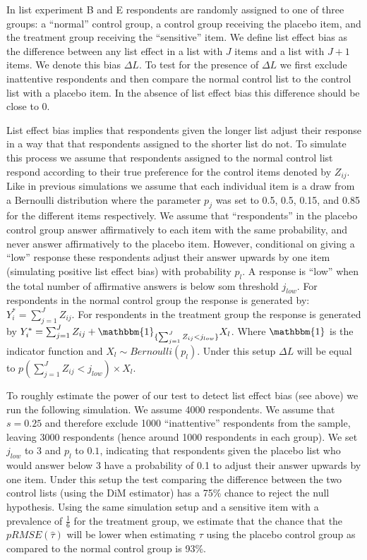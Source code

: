 \documentclass[]{article}
\begin{document}
In list experiment B and E respondents are randomly assigned to one of
three groups: a ``normal'' control group, a control group receiving the
placebo item, and the treatment group receiving the ``sensitive'' item.
We define list effect bias as the difference between any list effect in
a list with \(J\) items and a list with \(J+1\) items. We denote this
bias \(\Delta L\). To test for the presence of \(\Delta L\) we first
exclude inattentive respondents and then compare the normal control list
to the control list with a placebo item. In the absence of list effect
bias this difference should be close to 0.

List effect bias implies that respondents given the longer list adjust
their response in a way that that respondents assigned to the shorter
list do not. To simulate this process we assume that respondents
assigned to the normal control list respond according to their true
preference for the control items denoted by \(Z_{ij}\). Like in previous
simulations we assume that each individual item is a draw from a
Bernoulli distribution where the parameter \(p_{j}\) was set to 0.5,
0.5, 0.15, and 0.85 for the different items respectively. We assume that
``respondents'' in the placebo control group answer affirmatively to
each item with the same probability, and never answer affirmatively to
the placebo item. However, conditional on giving a ``low'' response
these respondents adjust their answer upwards by one item (simulating
positive list effect bias) with probability \(p_{l}\). A response is
``low'' when the total number of affirmative answers is below som
threshold \(j_{low}\). For respondents in the normal control group the
response is generated by: \(Y^*_{i} = \sum_{j=1}^{J} Z_{ij}\). For
respondents in the treatment group the response is generated by
\(Y^*_{i} = \sum_{j=1}^{J} Z_{ij} + \mathbbm{1}_{ \{ \sum_{j=1}^{J} Z_{ij}<j_{low} \} } X_{l}\).
Where \(\mathbbm{1}\) is the indicator function and
\(X_{l} \sim Bernoulli(p_{l})\). Under this setup \(\Delta L\) will be
equal to \(p(\sum_{j=1}^{J} Z_{ij}<j_{low}) \times X_{l}\).

To roughly estimate the power of our test to detect list effect bias
(see above) we run the following simulation. We assume 4000 respondents.
We assume that \(s=0.25\) and therefore exclude 1000 ``inattentive''
respondents from the sample, leaving 3000 respondents (hence around 1000
respondents in each group). We set \(j_{low}\) to 3 and \(p_{l}\) to
\(0.1\), indicating that respondents given the placebo list who would
answer below 3 have a probability of 0.1 to adjust their answer upwards
by one item. Under this setup the test comparing the difference between
the two control lists (using the DiM estimator) has a 75\% chance to
reject the null hypothesis. Using the same simulation setup and a
sensitive item with a prevalence of \(\frac{1}{6}\) for the treatment
group, we estimate that the chance that the \(pRMSE(\hat{\tau})\) will
be lower when estimating \(\tau\) using the placebo control group as
compared to the normal control group is 93\%.
\end{document}
